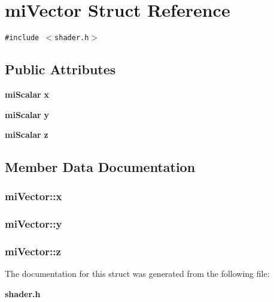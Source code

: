 \section{mi\-Vector Struct Reference}
\label{structmiVector}
{\tt \#include $<$shader.h$>$}

\subsection*{Public Attributes}
\begin{CompactItemize}
\item 
{\bf mi\-Scalar} {\bf x}
\item 
{\bf mi\-Scalar} {\bf y}
\item 
{\bf mi\-Scalar} {\bf z}
\end{CompactItemize}


\subsection{Member Data Documentation}
\subsubsection{ {\bf mi\-Vector::x}}\label{structmiVector_o0}


\subsubsection{ {\bf mi\-Vector::y}}\label{structmiVector_o1}


\subsubsection{ {\bf mi\-Vector::z}}\label{structmiVector_o2}




The documentation for this struct was generated from the following file:\begin{CompactItemize}
\item 
{\bf shader.h}\end{CompactItemize}
